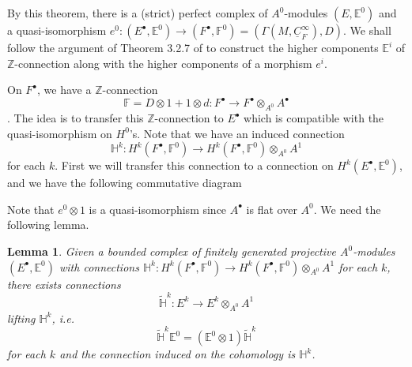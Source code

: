 \documentclass[12pt]{amsart}
\newtheorem{lem}[thm]{Lemma}
\theoremstyle{definition}
\theoremstyle{remark}
\numberwithin{equation}{section}
\newcommand{\A}{{A}}
\newcommand{\Z}{{\mathbb{Z}}}
\newcommand{\1}{{\mathbb{1}}}
\newcommand{\bt}{\bullet}
\begin{document}
By this theorem, there is a (strict) perfect complex of $\A^0$-modules $(E, \mathbb{E}^0)$ and a quasi-isomorphism $e^0:(E^{\bt}, \mathbb{E}^0) \to (F^{\bt}, \mathbb{F}^0) = (\Gamma(M, \underline{C}_{F}^{\infty}), D)$. We shall follow the argument of Theorem 3.2.7 of \cite{Blo05} to construct the higher components $\mathbb{E}^i$ of $\Z$-connection along with the higher components of a morphism $e^i$.

On $F^{\bt}$, we have a $\Z$-connection $$\mathbb{F} = D\otimes1 + 1\otimes d: F^{\bt} \to F^{\bt}\otimes_{\A^0} \A^{\bt}
$$. The idea is to transfer this $\Z$-connection to $E^{\bt}$ which is compatible with the quasi-isomorphism on $H^0$'s. Note that we have an induced connection 
$$
\mathbb{H}^k: H^k(F^{\bt}, \mathbb{F}^0) \to H^k(F^{\bt}, \mathbb{F}^0)\otimes_{\A^0} \A^{1}
$$
for each $k$. First we will transfer this connection to a connection on $H^k(E^{\bt}, \mathbb{E}^0)$, and we have the following commutative diagram
\begin{center}
\end{center}
Note that $e^0\otimes 1$ is a quasi-isomorphism since $\A^{\bt}$ is flat over $\A^0$. We need the following lemma.
\begin{lem}
    Given a bounded complex of finitely generated projective $\A^0$-modules $(E^{\bt}, \mathbb{E}^0)$ with connections $\mathbb{H}^k: H^k(F^{\bt}, \mathbb{F}^0) \to H^k(F^{\bt}, \mathbb{F}^0)\otimes_{\A^0} \A^{1}$ for each $k$, there exists connections
    $$
        \tilde{\mathbb{H}}^k: E^k \to E^k\otimes_{\A^0} \A^{1}
    $$
    lifting $\mathbb{H}^k$, i.e. 
    $$
    \tilde{\mathbb{H}}^k\mathbb{E}^0 = (\mathbb{E}^0\otimes 1)\tilde{\mathbb{H}}^k
    $$
    for each $k$
    and the connection induced on the cohomology is $\mathbb{H}^k$. 
\end{lem}
\end{document}
